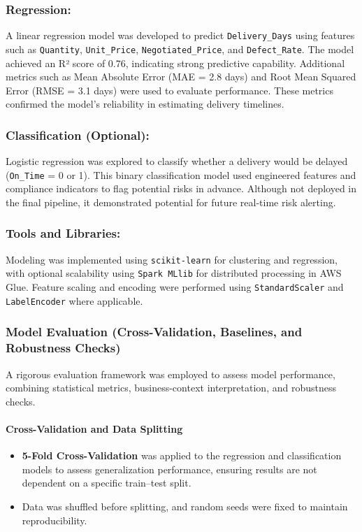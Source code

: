 \documentclass[10pt, twocolumn]{article}
\begin{document}
\subsubsection{Regression:} A linear regression model was developed to predict \texttt{Delivery\_Days} using features such as \texttt{Quantity}, \texttt{Unit\_Price}, \texttt{Negotiated\_Price}, and \texttt{Defect\_Rate}. The model achieved an R² score of 0.76, indicating strong predictive capability. Additional metrics such as Mean Absolute Error (MAE = 2.8 days) and Root Mean Squared Error (RMSE = 3.1 days) were used to evaluate performance. These metrics confirmed the model's reliability in estimating delivery timelines.

\subsubsection{Classification (Optional):} Logistic regression was explored to classify whether a delivery would be delayed (\texttt{On\_Time} = 0 or 1). This binary classification model used engineered features and compliance indicators to flag potential risks in advance. Although not deployed in the final pipeline, it demonstrated potential for future real-time risk alerting.

\subsubsection{Tools and Libraries:} Modeling was implemented using \texttt{scikit-learn} for clustering and regression, with optional scalability using \texttt{Spark MLlib} for distributed processing in AWS Glue. Feature scaling and encoding were performed using \texttt{StandardScaler} and \texttt{LabelEncoder} where applicable.

\subsubsection{Model Evaluation (Cross-Validation, Baselines, and Robustness Checks)}

A rigorous evaluation framework was employed to assess model performance, combining statistical metrics, business-context interpretation, and robustness checks.

\paragraph{Cross-Validation and Data Splitting}
\begin{itemize}
    \item \textbf{5-Fold Cross-Validation} was applied to the regression and classification models to assess generalization performance, ensuring results are not dependent on a specific train–test split.
    \item Data was shuffled before splitting, and random seeds were fixed to maintain reproducibility.
\end{itemize}
\end{document}
